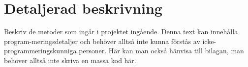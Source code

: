 \section{Detaljerad beskrivning}
Beskriv de metoder som ingår i projektet ingående. Denna text kan innehålla program-meringsdetaljer och behöver alltså inte kunna förstås av icke-programmeringskunniga personer. Här kan man också hänvisa till bilagan, man behöver alltså inte skriva en massa kod här.
